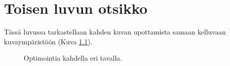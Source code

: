 \chapter{Toisen luvun otsikko} \label{Toinen luku}

Tässä luvussa tarkastellaan kahden kuvan upottamista samaan kelluvaan
kuvaympäristöön (Kuva \ref{fig:Optimointia-kahdella-eri}).

\begin{figure}[tbh]
\caption{Optimointia kahdella eri tavalla.\label{fig:Optimointia-kahdella-eri}}

\end{figure}

